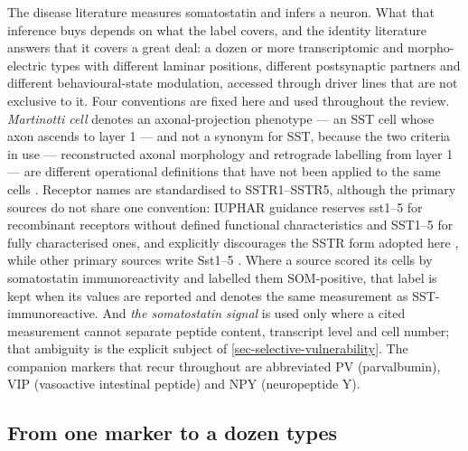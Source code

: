 \documentclass[11pt]{article}
\begin{document}
The disease literature measures somatostatin and infers a neuron. What that inference buys depends on what the label covers, and the identity literature answers that it covers a great deal: a dozen or more transcriptomic and morpho-electric types with different laminar positions, different postsynaptic partners and different behavioural-state modulation, accessed through driver lines that are not exclusive to it. Four conventions are fixed here and used throughout the review. \emph{Martinotti cell} denotes an axonal-projection phenotype --- an SST cell whose axon ascends to layer 1 --- and not a synonym for SST, because the two criteria in use --- reconstructed axonal morphology and retrograde labelling from layer 1 --- are different operational definitions that have not been applied to the same cells \citep{Jiang2015,Hostetler2023}. Receptor names are standardised to SSTR1--SSTR5, although the primary sources do not share one convention: IUPHAR guidance reserves sst1--5 for recombinant receptors without defined functional characteristics and SST1--5 for fully characterised ones, and explicitly discourages the SSTR form adopted here \citep{Gunther2018}, while other primary sources write Sst1--5 \citep{Lin2013}. Where a source scored its cells by somatostatin immunoreactivity and labelled them SOM-positive, that label is kept when its values are reported and denotes the same measurement as SST-immunoreactive. And \emph{the somatostatin signal} is used only where a cited measurement cannot separate peptide content, transcript level and cell number; that ambiguity is the explicit subject of \ref{sec-selective-vulnerability}. The companion markers that recur throughout are abbreviated PV (parvalbumin), VIP (vasoactive intestinal peptide) and NPY (neuropeptide Y).

\subsection{From one marker to a dozen types}
\label{sec-02-taxonomy}
\end{document}
